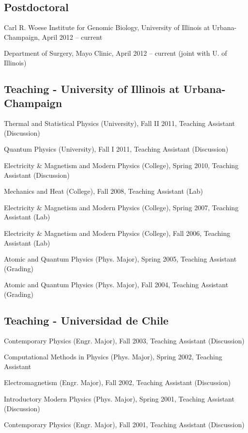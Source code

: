 \documentclass[letterpaper]{article}
\renewenvironment{itemize}{
  \begin{list}{}{
    \setlength{\leftmargin}{1.5em}
  }
}{
  \end{list}
}
\begin{document}
\subsection*{Postdoctoral}
\begin{itemize}
\item Carl R. Woese Institute for Genomic Biology, University of Illinois at Urbana-Champaign, April 2012 -- current
\item Department of Surgery, Mayo Clinic, April 2012 -- current (joint with U. of Illinois)
\end{itemize}
\subsection*{Teaching - University of Illinois at Urbana-Champaign}
\begin{itemize}
\item Thermal and Statistical Physics (University), Fall II 2011, Teaching Assistant (Discussion) %
\item Quantum Physics (University), Fall I 2011, Teaching Assistant (Discussion) %
\item Electricity \& Magnetism and Modern Physics (College), Spring 2010,
Teaching Assistant (Discussion) %
\item Mechanics and Heat (College), Fall 2008, Teaching Assistant (Lab)
\item Electricity \& Magnetism and Modern Physics (College), Spring 2007,
Teaching Assistant (Lab) %
\item Electricity \& Magnetism and Modern Physics (College), Fall 2006,
Teaching Assistant (Lab) %
\item Atomic and Quantum Physics (Phys. Major), Spring 2005,
Teaching Assistant (Grading) %
\item Atomic and Quantum Physics (Phys. Major), Fall
2004, Teaching Assistant (Grading) %
\end{itemize}
\subsection*{Teaching - Universidad de Chile}
\begin{itemize}
  \item Contemporary Physics (Engr. Major), Fall 2003, Teaching Assistant
  (Discussion) %
  \item Computational Methods in Physics (Phys. Major), Spring 2002, Teaching
  Assistant %
  \item Electromagnetism (Engr. Major), Fall 2002, Teaching Assistant
  (Discussion) %
  \item Introductory Modern Physics (Phys. Major), Spring 2001, Teaching
  Assistant (Discussion) %
  \item Contemporary Physics (Engr. Major), Fall 2001, Teaching Assistant
  (Discussion) %
\end{itemize}
\end{document}
